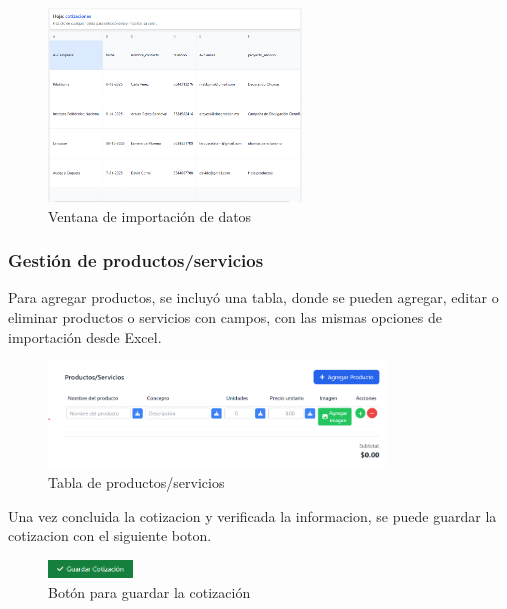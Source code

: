 \documentclass{Pretexto/bluereport}
\begin{document}
\begin{minipage}
\begin{figure}[H]
    \centering
    \includegraphics[width=0.6\textwidth]{img/ventana_importacion.png}
    \caption{Ventana de importación de datos}
    \label{fig:ventana_importacion}
\end{figure}


\subsubsection{Gestión de productos/servicios}

Para agregar productos, se incluyó una tabla, donde se pueden agregar, editar o eliminar productos o servicios con campos, con las mismas opciones de importación desde Excel.

\begin{figure}[H]
    \centering
    \includegraphics[width=0.8\textwidth]{img/tabla_productos.png}
    \caption{Tabla de productos/servicios}
    \label{fig:tabla_productos} 
\end{figure}

Una vez concluida la cotizacion y verificada la informacion, se puede guardar la cotizacion con el siguiente boton.

\begin{figure}[H]
    \centering
    \includegraphics[width=0.2\textwidth]{img/boton_guardar.png}
    \caption{Botón para guardar la cotización}
    \label{fig:boton_guardar}
\end{figure}


\end{minipage}
\end{document}
